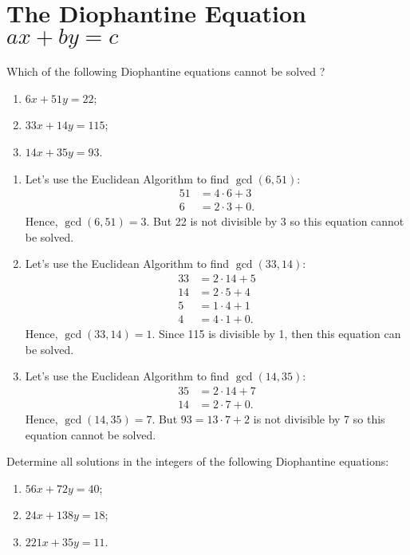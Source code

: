 \section{The Diophantine Equation $ax + by = c$}

\begin{exercise}
    Which of the following Diophantine equations cannot be solved ?
    \begin{enumerate}
        \item $6x + 51y = 22$;
        \item $33x + 14y = 115$;
        \item $14x + 35y = 93$.
    \end{enumerate}
\end{exercise}

\begin{solution}
    \begin{enumerate}
        \item Let's use the Euclidean Algorithm to find $\gcd(6, 51)$:
        \begin{align*}
            51 &= 4\cdot 6 + 3 \\
            6 &= 2\cdot 3 + 0. 
        \end{align*}
        Hence, $\gcd(6, 51) = 3$. But 22 is not divisible by 3 so this equation cannot be solved.
        \item Let's use the Euclidean Algorithm to find $\gcd(33, 14)$:
        \begin{align*}
            33 &= 2\cdot 14 + 5 \\
            14 &= 2\cdot 5 + 4 \\
            5 &= 1\cdot 4 + 1 \\
            4 &= 4\cdot 1 + 0. 
        \end{align*}
        Hence, $\gcd(33, 14) = 1$. Since 115 is divisible by 1, then this equation can be solved.
        \item Let's use the Euclidean Algorithm to find $\gcd(14, 35)$:
        \begin{align*}
            35 &= 2\cdot 14 + 7 \\
            14 &= 2\cdot 7 + 0. 
        \end{align*}
        Hence, $\gcd(14, 35) = 7$. But $93 = 13\cdot 7 + 2$ is not divisible by 7 so this equation cannot be solved.
    \end{enumerate}
\end{solution}

\begin{exercise}
    Determine all solutions in the integers of the following Diophantine equations:
    \begin{enumerate}
        \item $56x + 72y = 40$;
        \item $24x + 138y = 18$;
        \item $221x + 35y = 11$.
    \end{enumerate}
\end{exercise}

